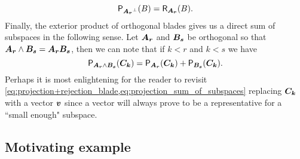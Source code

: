 \begin{equation}
\label{eq:projection_rejection_duality}
\mathsf{P}_{\boldsymbol{A_r}^\perp}(B) = \mathsf{R}_{\boldsymbol{A_r}}(B).
\end{equation}
Finally, the exterior product of orthogonal blades gives us a direct sum of subspaces in the following sense. Let $\boldsymbol{A_r}$ and $\boldsymbol{B_s}$ be orthogonal so that $\boldsymbol{A_r}\wedge \boldsymbol{B_s}=\boldsymbol{A_r}\boldsymbol{B_s}$, then we can note that if $k<r$ and $k<s$ we have
\begin{equation}
\label{eq:projection_sum_of_subspaces}
    \mathsf{P}_{\boldsymbol{A_r}\wedge \boldsymbol{B_s}} (\boldsymbol{C_k}) = \mathsf{P}_{\boldsymbol{A_r}}(\boldsymbol{C_k}) + \mathsf{P}_{\boldsymbol{B_s}}(\boldsymbol{C_k}).
\end{equation}
Perhaps it is most enlightening for the reader to revisit \cref{eq:projection+rejection_blade,eq:projection_sum_of_subspaces} replacing $\boldsymbol{C_k}$ with a vector $\boldsymbol{v}$ since a vector will always prove to be a representative for a ``small enough" subspace.


\subsection{Motivating example}
\label{subsec:motivating_example}

